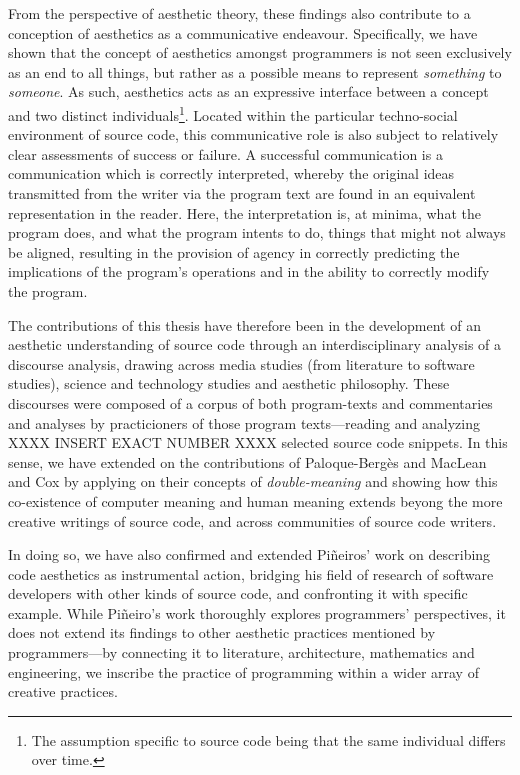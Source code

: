 From the perspective of aesthetic theory, these findings also contribute to a conception of aesthetics as a communicative endeavour. Specifically, we have shown that the concept of aesthetics amongst programmers is not seen exclusively as an end to all things, but rather as a possible means to represent \emph{something} to \emph{someone}. As such, aesthetics acts as an expressive interface between a concept and two distinct individuals\footnote{The assumption specific to source code being that the same individual differs over time.}. Located within the particular techno-social environment of source code, this communicative role is also subject to relatively clear assessments of success or failure. A successful communication is a communication which is correctly interpreted, whereby the original ideas transmitted from the writer via the program text are found in an equivalent representation in the reader. Here, the interpretation is, at minima, what the program does, and what the program intents to do, things that might not always be aligned, resulting in the provision of agency in correctly predicting the implications of the program's operations and in the ability to correctly modify the program.

The contributions of this thesis have therefore been in the development of an aesthetic understanding of source code through an interdisciplinary analysis of a discourse analysis, drawing across media studies (from literature to software studies), science and technology studies and aesthetic philosophy. These discourses were composed of a corpus of both program-texts and commentaries and analyses by practicioners of those program texts—reading and analyzing  XXXX INSERT EXACT NUMBER XXXX selected source code snippets. In this sense, we have extended on the contributions of Paloque-Bergès and MacLean and Cox by applying on their concepts of \emph{double-meaning} and showing how this co-existence of computer meaning and human meaning extends beyong the more creative writings of source code, and across communities of source code writers.

In doing so, we have also confirmed and extended Piñeiros' work on describing code aesthetics as instrumental action, bridging his field of research of software developers with other kinds of source code, and confronting it with specific example. While Piñeiro's work thoroughly explores programmers' perspectives, it does not extend its findings to other aesthetic practices mentioned by programmers—by connecting it to literature, architecture, mathematics and engineering, we inscribe the practice of programming within a wider array of creative practices.

